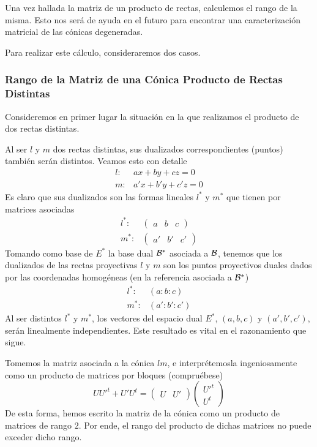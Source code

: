 Una vez hallada la matriz de un producto de rectas, calculemos el rango de la misma. Esto nos será de ayuda en el futuro para encontrar una caracterización matricial de las cónicas degeneradas.

Para realizar este cálculo, consideraremos dos casos.
\subsubsection{Rango de la Matriz de una Cónica Producto de Rectas Distintas}
Consideremos en primer lugar la situación en la que realizamos el producto de dos rectas distintas.

Al ser $l$ y $m$ dos rectas distintas, sus dualizados correspondientes (puntos) también serán distintos. Veamos esto con detalle
\[\begin{array}{cc}
l: & ax+by+cz=0\\
m: & a'x+b'y+c'z=0
\end{array}\]
Es claro que sus dualizados son las formas lineales $l^*$ y $m^*$ que tienen por matrices asociadas
\[\begin{array}{cc}
l^*: & \begin{pmatrix}
a & b & c
\end{pmatrix}\\
m^*: & \begin{pmatrix}
a' & b' & c'
\end{pmatrix}
\end{array}\]
Tomando como base de $E^*$ la base dual $\mathcal{B}^*$ asociada a $\mathcal{B}$, tenemos que los dualizados de las rectas proyectivas $l$ y $m$ son los puntos proyectivos duales dados por las coordenadas homogéneas (en la referencia asociada a $\mathcal{B}^*$)
\[\begin{array}{cc}
l^*: & (a:b:c)\\
m^*: & (a':b':c')
\end{array}\]
Al ser distintos $l^*$ y $m^*$, los vectores del espacio dual $E^*$, $(a,b,c)$ y $(a', b',c')$, serán linealmente independientes. Este resultado es vital en el razonamiento que sigue.

Tomemos la matriz asociada a la cónica $lm$, e interprétemosla ingeniosamente como un producto de matrices por bloques (compruébese)
\[UU'^t+U'U^t=\left(\begin{array}{c|c}
U&U'
\end{array}\right)\left(\begin{array}{c}
U'^t\\
\hline U^t
\end{array}\right)\]
De esta forma, hemos escrito la matriz de la cónica como un producto de matrices de rango $2$. Por ende, el rango del producto de dichas matrices no puede exceder dicho rango.

